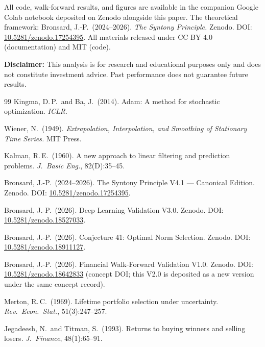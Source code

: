 \documentclass[11pt,a4paper]{article}
\begin{document}
All code, walk-forward results, and figures are available in the companion Google Colab notebook deposited on Zenodo alongside this paper. The theoretical framework: Bronsard, J.-P.\ (2024--2026). \emph{The Syntony Principle.} Zenodo. DOI: \href{https://doi.org/10.5281/zenodo.17254395}{10.5281/zenodo.17254395}. All materials released under CC BY 4.0 (documentation) and MIT (code).

\medskip\noindent
\textbf{Disclaimer:} This analysis is for research and educational purposes only and does not constitute investment advice. Past performance does not guarantee future results.

\begin{thebibliography}{99}
 Kingma, D.\,P.\ and Ba, J.\ (2014). Adam: A method for stochastic optimization. \emph{ICLR}.

 Wiener, N.\ (1949). \emph{Extrapolation, Interpolation, and Smoothing of Stationary Time Series.} MIT Press.

 Kalman, R.\,E.\ (1960). A new approach to linear filtering and prediction problems. \emph{J.\ Basic Eng.}, 82(D):35--45.

 Bronsard, J.-P.\ (2024--2026). The Syntony Principle V4.1 --- Canonical Edition. Zenodo. DOI: \href{https://doi.org/10.5281/zenodo.17254395}{10.5281/zenodo.17254395}.

 Bronsard, J.-P.\ (2026). Deep Learning Validation V3.0. Zenodo. DOI: \href{https://doi.org/10.5281/zenodo.18527033}{10.5281/zenodo.18527033}.

 Bronsard, J.-P.\ (2026). Conjecture 41: Optimal Norm Selection. Zenodo. DOI: \href{https://doi.org/10.5281/zenodo.18911127}{10.5281/zenodo.18911127}.

 Bronsard, J.-P.\ (2026). Financial Walk-Forward Validation V1.0. Zenodo. DOI: \href{https://doi.org/10.5281/zenodo.18642833}{10.5281/zenodo.18642833} (concept DOI; this V2.0 is deposited as a new version under the same concept record).

 Merton, R.\,C.\ (1969). Lifetime portfolio selection under uncertainty. \emph{Rev.\ Econ.\ Stat.}, 51(3):247--257.

 Jegadeesh, N.\ and Titman, S.\ (1993). Returns to buying winners and selling losers. \emph{J.\ Finance}, 48(1):65--91.


\end{thebibliography}
\end{document}
